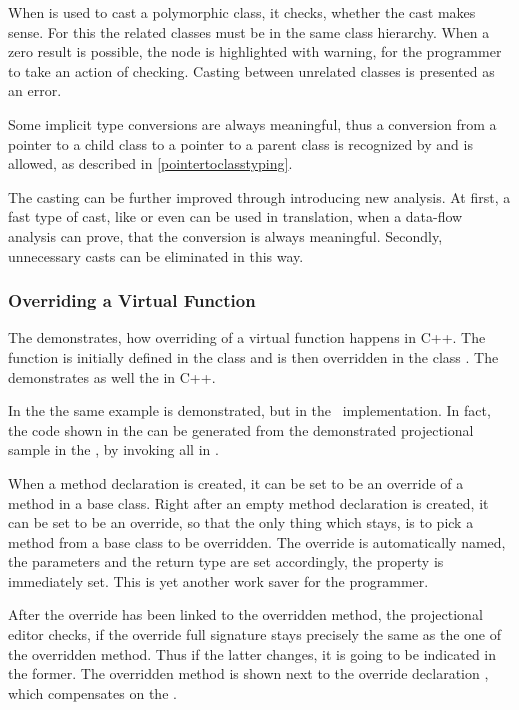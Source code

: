 When  is used to cast a polymorphic class, it checks, whether the cast makes sense.
For this the related classes must be in the same class hierarchy. When a zero result is possible,
the node is highlighted with warning, for the programmer to take an action of checking. Casting 
between unrelated classes is presented as an error.

Some implicit type conversions are always meaningful, thus a conversion from a pointer to 
a child class to a pointer to a parent class is recognized by \pcpp and is allowed, as 
described in \ref{pointertoclasstyping}.

The casting can be further improved through introducing new analysis. At first, a fast type of cast, 
like  or even  can be used in translation, when a data-flow analysis
can prove, that the conversion is always meaningful. Secondly, unnecessary casts can be eliminated in this way.


\subsubsection{Overriding a Virtual Function}
\label{overridefunction}

The  demonstrates, how overriding of a virtual function happens in C++.
The function  is initially defined in the class  and is then overridden
in the class . The  demonstrates as well the  in C++.


In the  the same example is demonstrated, but in the \pcpp\ implementation.
In fact, the code shown in the  can be generated 
from the demonstrated projectional sample in the , by invoking all  in \jbmps.

When a method declaration is created, it can be set to be an override of a method in a base class.
Right after an empty method declaration is created, it can be set to be an override, so that the only
thing which stays, is to pick a method from a base class to be overridden. The override is automatically
named, the parameters and the return type are set accordingly, the  property is immediately
set. This is yet another work saver for the programmer.

After the override has been linked to the overridden method, the projectional editor checks, if 
the override full signature stays precisely the same as the one of the overridden method. Thus if the 
latter changes, it is going to be indicated in the former.
The overridden method is shown next to the override declaration , which 
compensates on the .

